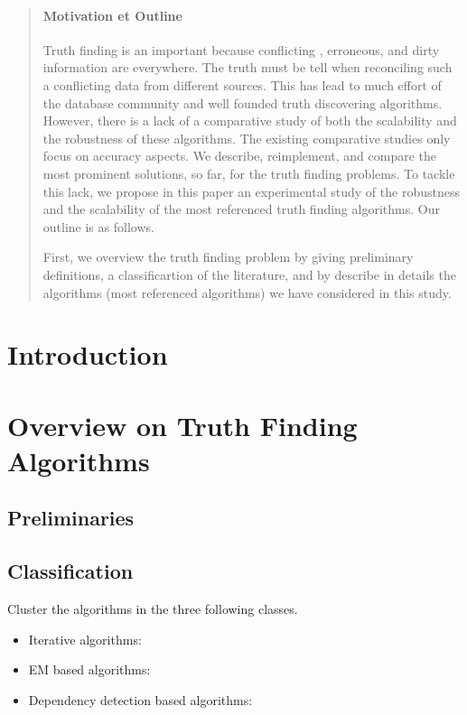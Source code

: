 \documentclass{vldb}
\begin{document}
\begin{abstract}
\paragraph*{Motivation et Outline} Truth finding is an important because conflicting , erroneous, and dirty
information are everywhere. The truth must be tell when reconciling such a conflicting data from different sources. 
This has lead to much effort of the database community and well founded truth discovering algorithms. However, there 
is a lack of a comparative study of both the scalability and the robustness of these algorithms. The existing comparative 
studies only focus on accuracy aspects. We describe, reimplement, and compare the most prominent solutions, so far, 
for the truth finding problems. To tackle this lack, we propose in this paper an experimental study of the robustness
and the scalability of the most referenced truth finding algorithms.  Our outline is as follows.


First, we overview the truth finding problem by giving preliminary definitions, a classificartion of the literature, and
by describe in details the algorithms (most referenced algorithms) we have considered in this study.


\end{abstract}

\section{Introduction}
\section{Overview on Truth Finding Algorithms}
\subsection{Preliminaries}
\subsection{Classification}
Cluster the algorithms in the three following classes.
\begin{itemize}
 \item Iterative algorithms:
 \item EM based algorithms:
 \item Dependency detection based algorithms:
\end{itemize}
\end{document}
